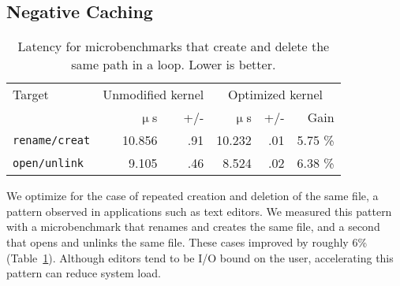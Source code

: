 

\subsection{Negative Caching}

\begin{table}[t]
\scriptsize
\centering
\begin{tabular}{|l|rr|rrr|}
\hline
Target & \multicolumn{2}{c|}{Unmodified kernel} & \multicolumn{3}{c|}{Optimized kernel} \\
& $\upmu$s & +/- & $\upmu$s & +/- & Gain\\
\hline
{\tt rename/creat} & 10.856 & .91 & 10.232 & .01 & 5.75 \% \\
\hline
{\tt open/unlink} & 9.105 & .46 & 8.524 & .02 & 6.38 \% \\
\hline
\end{tabular}
\caption{Latency for microbenchmarks that create and delete the same path in a loop. Lower is better.}
\label{table:neg-dentry-microbench}
\end{table}


We optimize for the case of repeated creation and deletion of the same file, 
a pattern observed in applications such as text editors.
We measured this pattern with a microbenchmark that renames and creates the same file, and a second
that opens and unlinks the same file.  These cases improved by roughly 6\% (Table~\ref{table:neg-dentry-microbench}).
Although editors tend to be I/O bound on the user, accelerating this pattern can reduce system load. 



